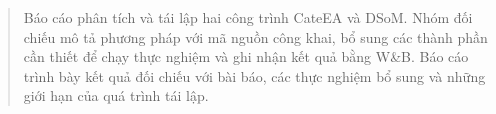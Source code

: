 \begin{abstract}
Báo cáo phân tích và tái lập hai công trình CateEA và DSoM.
Nhóm đối chiếu mô tả phương pháp với mã nguồn công khai,
bổ sung các thành phần cần thiết để chạy thực nghiệm và
ghi nhận kết quả bằng W\&B. Báo cáo trình bày kết quả đối
chiếu với bài báo, các thực nghiệm bổ sung và những giới hạn
của quá trình tái lập.
\end{abstract}
